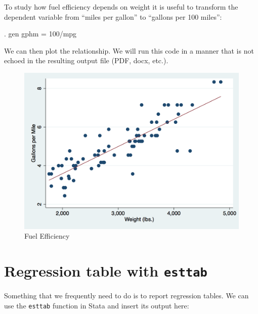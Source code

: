\documentclass[]{article}
\begin{document}
To study how fuel efficiency depends on weight it is useful to transform
the dependent variable from ``miles per gallon'' to ``gallons per 100
miles'':

\begin{stlog}
. gen gphm = 100/mpg
\end{stlog}

We can then plot the relationship. We will run this code in a manner
that is not echoed in the resulting output file (PDF, docx, etc.).

\begin{stlog}


{\smallskip}

\end{stlog}

\begin{figure}
\centering
\includegraphics[width=0.75\linewidth]{auto.png}
\caption{Fuel Efficiency}
\end{figure}

\hypertarget{regression-table-with-esttab}{%
\section{\texorpdfstring{Regression table with
\texttt{esttab}}{Regression table with esttab}}\label{regression-table-with-esttab}}

Something that we frequently need to do is to report regression tables.
We can use the \texttt{esttab} function in Stata and insert its output
here:

\begin{stlog}

{\smallskip}

{\smallskip}


\end{stlog}

\begin{center}

\end{center}
\end{document}
